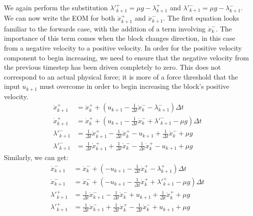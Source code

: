 \documentclass{article}
\begin{document}
We again perform the substitution $\lambda'^+_{k+1} = \mu g - \lambda_{k+1}^+$ and $\lambda'^-_{k+1} = \mu g - \lambda_{k+1}^-$. We can now write the EOM for both $\dot x^+_{k+1}$ and $\dot x^-_{k+1}$. The first equation looks familiar to the forwards case, with the addition of a term involving $\dot x^-_k$. The importance of this term comes when the block changes direction, in this case from a negative velocity to a positive velocity. In order for the positive velocity component to begin increasing, we need to ensure that the negative velocity from the previous timestep has been driven completely to zero. This does not correspond to an actual physical force; it is more of a force threshold that the input $u_{k+1}$ must overcome in order to begin increasing the block's positive velocity.
\begin{align*}
    \dot x^+_{k+1} &= \dot x^+_k + (u_{k+1} - \frac{1}{\Delta t} \dot x^-_{k} - \lambda^-_{k+1}) \Delta t \\
    \dot x^+_{k+1} &= \dot x^+_k + (u_{k+1} - \frac{1}{\Delta t} \dot x^-_{k} + \lambda'^-_{k+1} - \mu g) \Delta t \\
    \lambda'^-_{k+1} &= \frac{1}{\Delta t} \dot x^+_{k+1} - \frac{1}{\Delta t} \dot x^+_k - u_{k+1} + \frac{1}{\Delta t} \dot x^-_{k} + \mu g \\
    \lambda'^-_{k+1} &= \frac{1}{\Delta t} \dot x^+_{k+1} + \frac{1}{\Delta t} \dot x^-_{k} - \frac{1}{\Delta t} \dot x^+_k - u_{k+1} + \mu g
\end{align*}
Similarly, we can get:
\begin{align*}
    \dot x^-_{k+1} &= \dot x^-_k + (-u_{k+1} - \frac{1}{\Delta t} \dot x^+_{k} - \lambda^+_{k+1}) \Delta t \\
    \dot x^-_{k+1} &= \dot x^-_k + (-u_{k+1} - \frac{1}{\Delta t} \dot x^+_{k} + \lambda'^+_{k+1} - \mu g) \Delta t \\
    \lambda'^+_{k+1} &= \frac{1}{\Delta t} \dot x^-_{k+1} - \frac{1}{\Delta t} \dot x^-_k + u_{k+1} + \frac{1}{\Delta t} \dot x^+_{k} + \mu g \\
    \lambda'^+_{k+1} &= \frac{1}{\Delta t} \dot x^-_{k+1} + \frac{1}{\Delta t} \dot x^+_{k} - \frac{1}{\Delta t} \dot x^-_k + u_{k+1} + \mu g
\end{align*}
\end{document}
